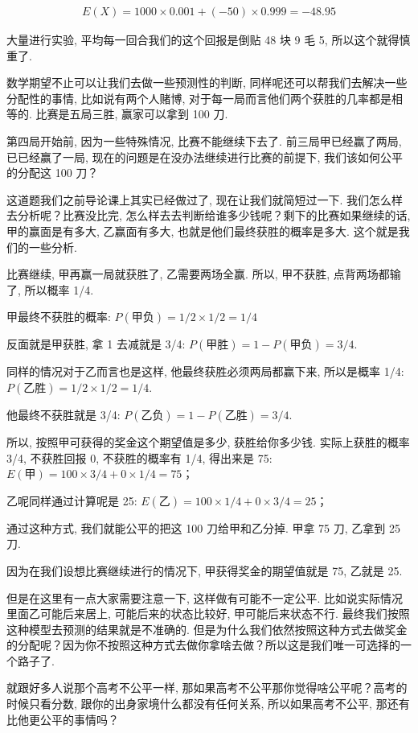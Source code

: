 \begin{align*}
  E(X) = 1000 \times 0.001 + (-50) \times 0.999 = -48.95
\end{align*}

大量进行实验, 平均每一回合我们的这个回报是倒贴 48 块 9 毛 5, 所以这个就得慎重了. 

数学期望不止可以让我们去做一些预测性的判断, 同样呢还可以帮我们去解决一些分配性的事情, 比如说有两个人赌博, 对于每一局而言他们两个获胜的几率都是相等的. 比赛是五局三胜, 赢家可以拿到 100 刀. 

第四局开始前, 因为一些特殊情况, 比赛不能继续下去了. 前三局甲已经赢了两局, 已已经赢了一局, 现在的问题是在没办法继续进行比赛的前提下, 我们该如何公平的分配这 100 刀？

这道题我们之前导论课上其实已经做过了, 现在让我们就简短过一下. 我们怎么样去分析呢？比赛没比完, 怎么样去去判断给谁多少钱呢？剩下的比赛如果继续的话, 甲的赢面是有多大, 乙赢面有多大, 也就是他们最终获胜的概率是多大. 这个就是我们的一些分析. 

比赛继续, 甲再赢一局就获胜了, 乙需要两场全赢. 所以, 甲不获胜, 点背两场都输了, 所以概率 1/4. 

甲最终不获胜的概率: $P(\mbox{甲负})= 1/2 \times 1/2 = 1/4$

反面就是甲获胜, 拿 1 去减就是 3/4: $P(\mbox{甲胜}) = 1 - P(\mbox{甲负}) = 3/4. $

同样的情况对于乙而言也是这样, 他最终获胜必须两局都赢下来, 所以是概率 1/4: $P(\mbox{乙胜})  = 1/2 \times 1/2 = 1/4$. 

他最终不获胜就是 3/4:  $P(\mbox{乙负}) = 1 - P(\mbox{乙胜})  = 3/4$. 

所以, 按照甲可获得的奖金这个期望值是多少, 获胜给你多少钱. 实际上获胜的概率 3/4, 不获胜回报 0, 不获胜的概率有 1/4, 得出来是 75: $E(\mbox{甲}) = 100 \times 3/4 + 0 \times 1/4 = 75$；

乙呢同样通过计算呢是 25: $E(\mbox{乙}) = 100 \times 1/4 + 0 \times 3/4 = 25$；

通过这种方式, 我们就能公平的把这 100 刀给甲和乙分掉. 甲拿 75 刀, 乙拿到 25 刀. 

因为在我们设想比赛继续进行的情况下, 甲获得奖金的期望值就是 75, 乙就是 25. 

但是在这里有一点大家需要注意一下, 这样做有可能不一定公平. 比如说实际情况里面乙可能后来居上, 可能后来的状态比较好, 甲可能后来状态不行. 最终我们按照这种模型去预测的结果就是不准确的. 但是为什么我们依然按照这种方式去做奖金的分配呢？因为你不按照这种方式去做你拿啥去做？所以这是我们唯一可选择的一个路子了. 

就跟好多人说那个高考不公平一样, 那如果高考不公平那你觉得啥公平呢？高考的时候只看分数, 跟你的出身家境什么都没有任何关系, 所以如果高考不公平, 那还有比他更公平的事情吗？

